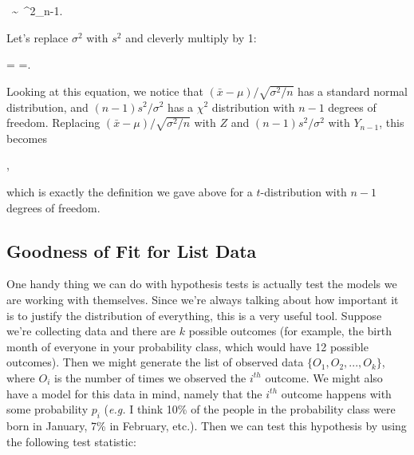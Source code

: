 \bel

\ \sim \ \chi^2_{n-1}.

\eel

Let's replace $\sigma^2$ with $s^2$ and cleverly multiply by 1:



\bel

 = =\cdot {}.

\eel

Looking at this equation, we notice that $(\bar{x}-\mu)/\sqrt{\sigma^2/n}$ has a standard normal distribution, and $(n-1)s^2/\sigma^2$ has a $\chi^2$ distribution with $n-1$ degrees of freedom.  Replacing $(\bar{x}-\mu)/\sqrt{\sigma^2/n}$ with $Z$ and $(n-1)s^2/\sigma^2$ with $Y_{n-1}$, this becomes



\bel

,

\eel

which is exactly the definition we gave above for a $t$-distribution with $n-1$ degrees of freedom.







\subsection{Goodness of Fit for List Data}



One handy thing we can do with hypothesis tests is actually test the models we are working with themselves.  Since we're always talking about how important it is to justify the distribution of everything, this is a very useful tool.  Suppose we're collecting data and there are $k$ possible outcomes (for example, the birth month of everyone in your probability class, which would have 12 possible outcomes).  Then we might generate the list of observed data $\{O_1, O_2,..., O_k\}$, where $O_i$ is the number of times we observed the $i^{th}$ outcome.  We might also have a model for this data in mind, namely that the $i^{th}$ outcome happens with some probability $p_i$ (\emph{e.g.} I think 10\% of the people in the probability class were born in January, 7\% in February, etc.).  Then we can test this hypothesis by using the following test statistic:



